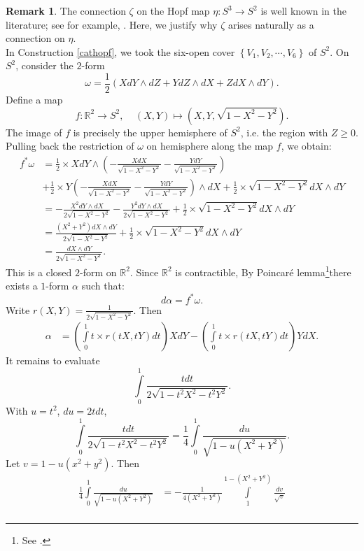 \documentclass{article}
\theoremstyle{plain}
\theoremstyle{definition}
\newtheorem{rem}[thm]{Remark}
\begin{document}
\begin{rem}\label{connection_on_Hopf_just}
The connection $\zeta$ on the Hopf map $\eta:S^3 \longrightarrow S^2$ is well known in the literature; see for example, \cite[on page 269]{MR3012377}. Here, we justify why $\zeta$ arises naturally as a connection on $\eta$.
\\
In Construction \ref{cathopf}, we took the six-open cover $\left\{V_1, V_2, \cdots, V_6\right\}$ of $S^2$. On $S^2$, consider the $2$-form
\[
\omega = \frac{1}{2}\left(XdY \wedge dZ + YdZ \wedge dX + ZdX \wedge dY\right).
\]
Define a map
\[
f:\mathbb{R}^2 \longrightarrow S^2, ~~~~~ (X,Y) \longmapsto \left(X,Y,\sqrt{1 - X^2 - Y^2}\right).
\]
The image of $f$ is precisely the upper hemisphere of $S^2$, i.e. the region with $Z \geq 0$. \\
Pulling back the restriction of $\omega$ on hemisphere along the map $f$, we obtain:
\begin{align*}
f^\ast\omega & = \frac{1}{2} \times XdY \wedge \left(-\frac{XdX}{\sqrt{1-X^2-Y^2}} - \frac{YdY}{\sqrt{1-X^2-Y^2}}\right) \\
& + \frac{1}{2} \times Y\left(-\frac{XdX}{\sqrt{1-X^2-Y^2}} - \frac{YdY}{\sqrt{1-X^2-Y^2}}\right) \wedge dX + \frac{1}{2} \times \sqrt{1-X^2-Y^2}dX \wedge dY \\
& = -\frac{X^2dY \wedge dX}{2\sqrt{1-X^2-Y^2}} - \frac{Y^2dY \wedge dX}{2\sqrt{1-X^2-Y^2}} + \frac{1}{2} \times \sqrt{1-X^2-Y^2}dX \wedge dY \\
& = \frac{(X^2+Y^2)dX \wedge dY}{2\sqrt{1-X^2-Y^2}} + \frac{1}{2} \times \sqrt{1-X^2-Y^2}dX \wedge dY \\
& = \frac{dX \wedge dY}{2\sqrt{1-X^2-Y^2}}.
\end{align*}
This is a closed $2$-form on $\mathbb{R}^2$. Since $\mathbb{R}^2$ is contractible, By Poincar\'{e} lemma\footnote{See \cite[on page 94]{MR209411}.}there exists a $1$-form $\alpha$ such that:
\[
d\alpha = f^\ast\omega.
\]
Write $r(X,Y) = \frac{1}{2\sqrt{1-X^2-Y^2}}$. Then
\begin{align*}
\alpha & = \left(\int\limits_0^1 t \times r(tX,tY)dt\right)XdY - \left(\int\limits_0^1 t \times r(tX,tY)dt\right)YdX.
\end{align*}
It remains to evaluate
\[
\int\limits_0^1 \frac{tdt}{2\sqrt{1-t^2X^2-t^2Y^2}}.
\]
With $u = t^2$, $du = 2tdt$,
\[
\int\limits_0^1 \frac{tdt}{2\sqrt{1-t^2X^2-t^2Y^2}} = \frac{1}{4}\int\limits_0^1 \frac{du}{\sqrt{1-u(X^2+Y^2)}}.
\]
Let $v = 1- u(x^2+y^2)$. Then
\begin{align*}
\frac{1}{4}\int\limits_0^1 \frac{du}{\sqrt{1-u(X^2+Y^2)}} & = -\frac{1}{4(X^2+Y^2)}\int\limits_1^{1-(X^2+Y^2)} \frac{dv}{\sqrt{v}} \\

\end{align*}
\end{rem}
\end{document}
